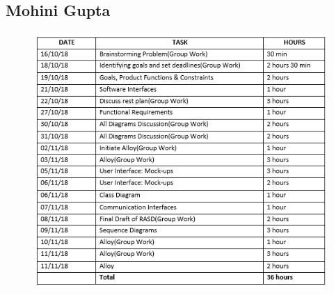 \subsection{Mohini Gupta}
\begin{figure}[H]
	\begin{center}
		\includegraphics[width=\textwidth]{./Diagrams/Effort_Mohini.PNG}
	\end{center}
\end{figure}
